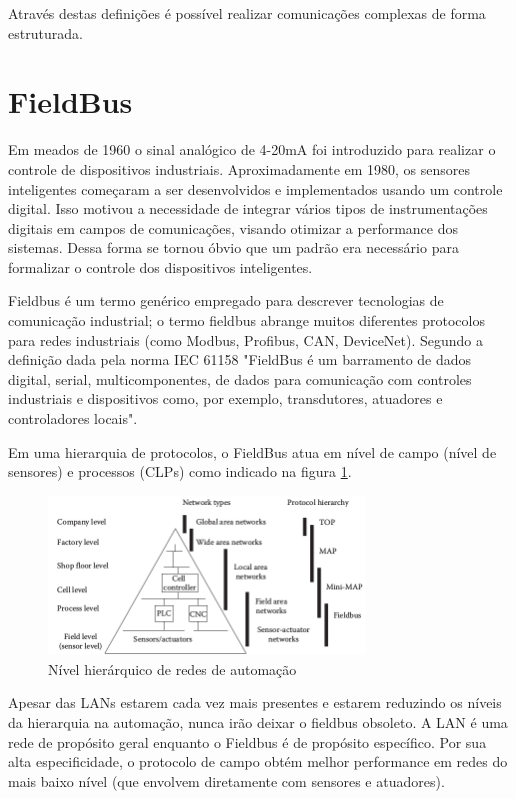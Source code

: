 Através destas definições é possível realizar comunicações complexas de forma estruturada.

\section{FieldBus}

Em meados de 1960 o sinal analógico de 4-20mA foi introduzido para realizar o controle de dispositivos industriais. Aproximadamente em 1980, os sensores inteligentes começaram a ser desenvolvidos e implementados usando um controle digital. Isso motivou a necessidade de integrar vários tipos de instrumentações digitais em campos de comunicações, visando otimizar a performance dos sistemas. Dessa forma se tornou óbvio que um padrão era necessário para formalizar o controle dos dispositivos inteligentes.

Fieldbus é um termo genérico empregado para descrever tecnologias de comunicação industrial; o termo fieldbus abrange muitos diferentes protocolos para redes industriais (como Modbus, Profibus, CAN, DeviceNet). Segundo a definição dada pela norma IEC 61158 \cite{iec61158} "FieldBus é um barramento de dados digital, serial, multicomponentes, de dados para comunicação com controles industriais e dispositivos como, por exemplo, transdutores, atuadores e controladores locais". 

Em uma hierarquia de protocolos, o FieldBus atua em nível de campo (nível de sensores) e processos (CLPs) como indicado na figura \ref{im::hiefb}.

\begin{figure}[H]
\centering
\includegraphics[width=0.75\textwidth]{imagens/hierarquiafieldbus}
\caption{Nível hierárquico de redes de automação \cite{book:zur}}
\label{im::hiefb}
\end{figure}  

Apesar das LANs estarem cada vez mais presentes e estarem reduzindo os níveis da hierarquia na automação, nunca irão deixar o fieldbus obsoleto. A LAN é uma rede de propósito geral enquanto o Fieldbus é de propósito específico. Por sua alta especificidade, o protocolo de campo obtém melhor performance em redes do mais baixo nível (que envolvem diretamente com sensores e atuadores).

